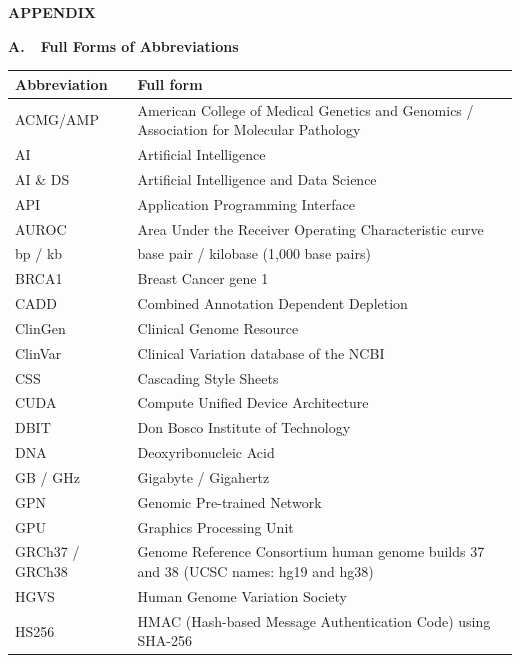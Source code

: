 \clearpage
\label{s:app:start}
\begin{center}{\fontsize{16}{18}\selectfont\bfseries APPENDIX}\end{center}\vspace{2pt}
{\fontsize{14}{16}\selectfont\bfseries A.\ \ Full Forms of Abbreviations}\par\vspace{4pt}
\begingroup
\fontsize{11}{12.5}\selectfont\renewcommand{\baselinestretch}{1}\selectfont\setlength{\parskip}{0pt}
\renewcommand{\arraystretch}{1.05}
\setlength{\LTleft}{0pt}\setlength{\LTright}{0pt}
\begin{longtable}{|p{110pt}|p{343pt}|}
\hline \textbf{Abbreviation} & \textbf{Full form}\\
\endhead
\hline ACMG/AMP & American College of Medical Genetics and Genomics / Association for Molecular Pathology\\
\hline AI & Artificial Intelligence\\
\hline AI \& DS & Artificial Intelligence and Data Science\\
\hline API & Application Programming Interface\\
\hline AUROC & Area Under the Receiver Operating Characteristic curve\\
\hline bp / kb & base pair / kilobase (1,000 base pairs)\\
\hline BRCA1 & Breast Cancer gene 1\\
\hline CADD & Combined Annotation Dependent Depletion\\
\hline ClinGen & Clinical Genome Resource\\
\hline ClinVar & Clinical Variation database of the NCBI\\
\hline CSS & Cascading Style Sheets\\
\hline CUDA & Compute Unified Device Architecture\\
\hline DBIT & Don Bosco Institute of Technology\\
\hline DNA & Deoxyribonucleic Acid\\
\hline GB / GHz & Gigabyte / Gigahertz\\
\hline GPN & Genomic Pre-trained Network\\
\hline GPU & Graphics Processing Unit\\
\hline GRCh37 / GRCh38 & Genome Reference Consortium human genome builds 37 and 38 (UCSC names: hg19 and hg38)\\
\hline HGVS & Human Genome Variation Society\\
\hline HS256 & HMAC (Hash-based Message Authentication Code) using SHA-256\\

\end{longtable}
